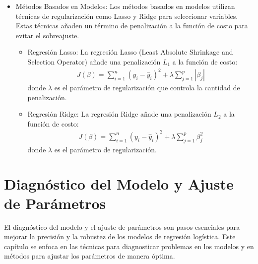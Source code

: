 \documentclass[a4paper]{report} %
\begin{document}
\begin{itemize}
\begin{itemize}
\item M\'etodos Basados en Modelos: Los m\'etodos basados en modelos utilizan t\'ecnicas de regularizaci\'on como Lasso y Ridge para seleccionar variables. Estas t\'ecnicas a\~naden un t\'ermino de penalizaci\'on a la funci\'on de costo para evitar el sobreajuste.

\begin{itemize}
\item Regresi\'on Lasso: La regresi\'on Lasso (Least Absolute Shrinkage and Selection Operator) a\~nade una penalizaci\'on $L_1$ a la funci\'on de costo:
\begin{eqnarray*}
J(\beta) = \sum_{i=1}^{n} (y_i - \hat{y}_i)^2 + \lambda \sum_{j=1}^{p} |\beta_j|
\end{eqnarray*}
donde $\lambda$ es el par\'ametro de regularizaci\'on que controla la cantidad de penalizaci\'on.

\item Regresi\'on Ridge: La regresi\'on Ridge a\~nade una penalizaci\'on $L_2$ a la funci\'on de costo:
\begin{eqnarray*}
J(\beta) = \sum_{i=1}^{n} (y_i - \hat{y}_i)^2 + \lambda \sum_{j=1}^{p} \beta_j^2
\end{eqnarray*}
donde $\lambda$ es el par\'ametro de regularizaci\'on.
\end{itemize}
\end{itemize}
\end{itemize}


\chapter{Diagn\'ostico del Modelo y Ajuste de Par\'ametros}


El diagn\'ostico del modelo y el ajuste de par\'ametros son pasos esenciales para mejorar la precisi\'on y la robustez de los modelos de regresi\'on log\'istica. Este cap\'itulo se enfoca en las t\'ecnicas para diagnosticar problemas en los modelos y en m\'etodos para ajustar los par\'ametros de manera \'optima.
\end{document}
